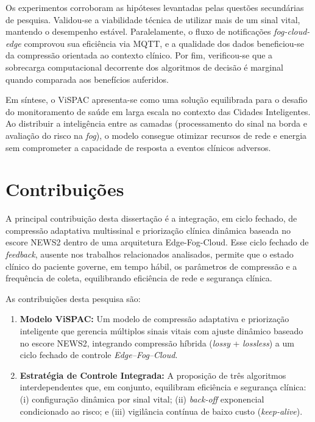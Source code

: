 \documentclass[twoside,english,brazilian]{UNISINOSmonografia}
\begin{document}
Os experimentos corroboram as hipóteses levantadas pelas questões secundárias de pesquisa. Validou-se a viabilidade técnica de utilizar mais de um sinal vital, mantendo o desempenho estável. Paralelamente, o fluxo de notificações \textit{fog-cloud-edge} comprovou sua eficiência via MQTT, e a qualidade dos dados beneficiou-se da compressão orientada ao contexto clínico. Por fim, verificou-se que a sobrecarga computacional decorrente dos algoritmos de decisão é marginal quando comparada aos benefícios auferidos.

Em síntese, o ViSPAC apresenta-se como uma solução equilibrada para o desafio do monitoramento de saúde em larga escala no contexto das Cidades Inteligentes. Ao distribuir a inteligência entre as camadas (processamento do sinal na borda e avaliação do risco na \textit{fog}), o modelo consegue otimizar recursos de rede e energia sem comprometer a capacidade de resposta a eventos clínicos adversos.

\section{Contribuições}
A principal contribuição desta dissertação é a integração, em ciclo fechado, de compressão adaptativa multissinal e priorização clínica dinâmica baseada no escore NEWS2 dentro de uma arquitetura Edge-Fog-Cloud. Esse ciclo fechado de \textit{feedback}, ausente nos trabalhos relacionados analisados, permite que o estado clínico do paciente governe, em tempo hábil, os parâmetros de compressão e a frequência de coleta, equilibrando eficiência de rede e segurança clínica.

As contribuições desta pesquisa são:
\begin{enumerate}
    \item \textbf{Modelo ViSPAC:} Um modelo de compressão adaptativa e priorização inteligente que gerencia múltiplos sinais vitais com ajuste dinâmico baseado no escore NEWS2, integrando compressão híbrida (\textit{lossy} + \textit{lossless}) a um ciclo fechado de controle \textit{Edge--Fog--Cloud}.

    \item \textbf{Estratégia de Controle Integrada:} A proposição de três algoritmos interdependentes que, em conjunto, equilibram eficiência e segurança clínica: (i) configuração dinâmica por sinal vital; (ii) \textit{back-off} exponencial condicionado ao risco; e (iii) vigilância contínua de baixo custo (\textit{keep-alive}).
\end{enumerate}
\end{document}
